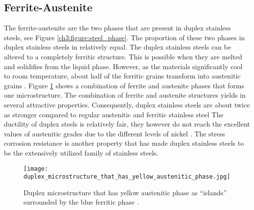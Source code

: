 \subsection{Ferrite-Austenite}
The ferrite-austenite are the two phases that are present in duplex stainless steels, see Figure \ref{ch3:figure:steel_phase}. The proportion of these two phases in duplex stainless steels in relatively equal. The duplex stainless steels can be altered to a completely ferritic structure. This is possible when they are melted and solidifies from the liquid phase\cite{xiao2006challenge}.  However, as the materials significantly cool to room temperature, about half of the ferritic grains transform into austenitic grains \cite{steels3practical}. Figure \ref{ch3:figure:duplex_microstructure} shows a combination of ferrite and austenite phases that forms one microstructure.
The combination of ferrite and austenite structures yields in several attractive properties. Consequently, duplex stainless steels are about twice as stronger compared to regular austenitic and ferritic stainless steel \cite{steels3practical} The ductility of duplex steels is relatively fair, they however do not reach the excellent values of austenitic grades due to the different levels of nickel \cite{molabe2018determining}. The stress corrosion resistance is another property that has made duplex stainless steels to be the extensively utilized family of stainless steels. 

\begin{figure}[H]
    \centering
    \texttt{[image: duplex\_microstructure\_that\_has\_yellow\_austenitic\_phase.jpg]}
    \caption{Duplex microstructure that has yellow austenitic phase as “islands” surrounded by the blue ferritic phase \cite{steels3practical}.}
    \label{ch3:figure:duplex_microstructure}
\end{figure}

